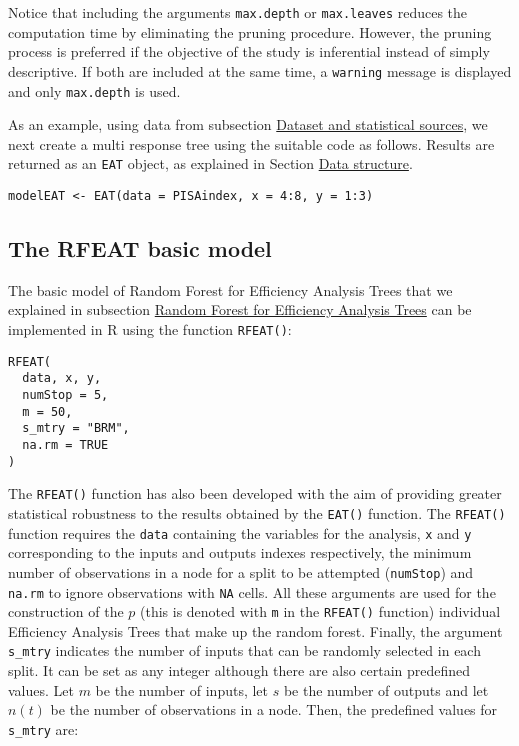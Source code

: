 Notice that including the arguments \texttt{max.depth} or \texttt{max.leaves} reduces the computation time by eliminating the pruning procedure. However, the pruning process is preferred if the objective of the study is inferential instead of simply descriptive. If both are included at the same time, a \texttt{warning} message is displayed and only \texttt{max.depth} is used.

As an example, using data from subsection \protect\hyperlink{section3.1}{Dataset and statistical sources}, we next create a multi response tree using the suitable code as follows. Results are returned as an \texttt{EAT} object, as explained in Section \protect\hyperlink{section3}{Data structure}.

\begin{verbatim}
modelEAT <- EAT(data = PISAindex, x = 4:8, y = 1:3)
\end{verbatim}

\hypertarget{the-rfeat-basic-model}{%
\subsection{The RFEAT basic model}\label{the-rfeat-basic-model}}

The basic model of Random Forest for Efficiency Analysis Trees that we explained in subsection \protect\hyperlink{section2.2}{Random Forest for Efficiency Analysis Trees} can be implemented in R using the function \texttt{RFEAT()}:

\begin{verbatim}
RFEAT(
  data, x, y,
  numStop = 5,
  m = 50,
  s_mtry = "BRM",
  na.rm = TRUE
)
\end{verbatim}

The \texttt{RFEAT()} function has also been developed with the aim of providing greater statistical robustness to the results obtained by the \texttt{EAT()} function. The \texttt{RFEAT()} function requires the \texttt{data} containing the variables for the analysis, \texttt{x} and \texttt{y} corresponding to the inputs and outputs indexes respectively, the minimum number of observations in a node for a split to be attempted (\texttt{numStop}) and \texttt{na.rm} to ignore observations with \texttt{NA} cells. All these arguments are used for the construction of the \(p\) (this is denoted with \texttt{m} in the \texttt{RFEAT()} function) individual Efficiency Analysis Trees that make up the random forest. Finally, the argument \texttt{s\_mtry} indicates the number of inputs that can be randomly selected in each split. It can be set as any integer although there are also certain predefined values. Let \(m\) be the number of inputs, let \(s\) be the number of outputs and let \(n(t)\) be the number of observations in a node. Then, the predefined values for \texttt{s\_mtry} are:

